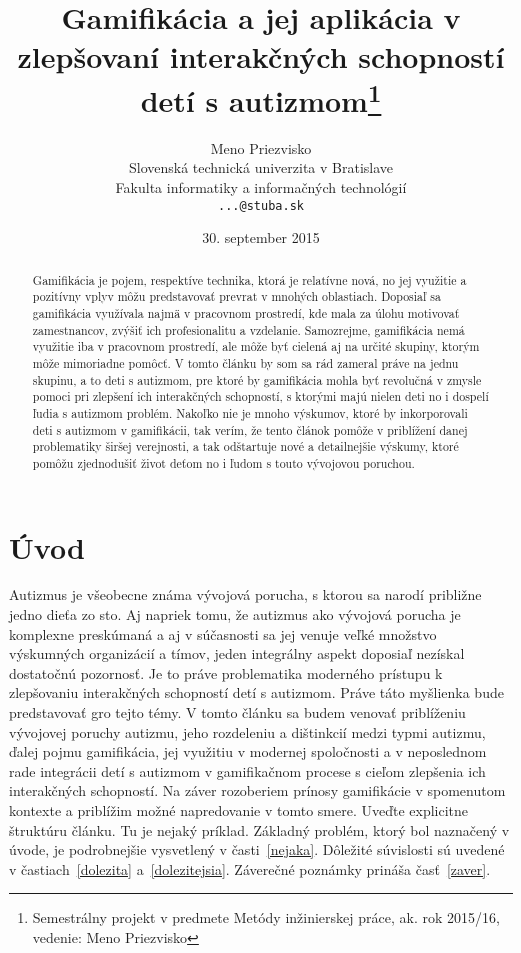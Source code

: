\documentclass[10pt,twoside,slovak,a4paper]{coursepaper}
\title{Gamifikácia a jej aplikácia v zlepšovaní interakčných schopností detí s autizmom\thanks{Semestrálny projekt v predmete Metódy inžinierskej práce, ak. rok 2015/16, vedenie: Meno Priezvisko}} %
\author{Meno Priezvisko\\[2pt]
	{\small Slovenská technická univerzita v Bratislave}\\
	{\small Fakulta informatiky a informačných technológií}\\
	{\small \texttt{...@stuba.sk}}
	}
\date{\small 30. september 2015} %
\begin{document}
\maketitle

\begin{abstract}
	Gamifikácia je pojem, respektíve technika, ktorá je relatívne nová, no jej využitie a pozitívny vplyv môžu predstavovať prevrat v mnohých oblastiach. Doposiaľ sa gamifikácia využívala najmä v pracovnom prostredí, kde mala za úlohu motivovať zamestnancov, zvýšiť ich profesionalitu a vzdelanie. Samozrejme, gamifikácia nemá využitie iba v pracovnom prostredí, ale môže byť cielená aj na určité skupiny, ktorým môže mimoriadne pomôcť. 
V tomto článku by som sa rád zameral práve na jednu skupinu, a to deti s autizmom, pre ktoré by gamifikácia mohla byť revolučná v zmysle pomoci pri zlepšení ich interakčných schopností, s ktorými majú nielen deti no i dospelí ľudia s autizmom problém. Nakoľko nie je mnoho výskumov, ktoré by inkorporovali deti s autizmom v gamifikácii, tak verím, že tento článok pomôže v priblížení danej problematiky širšej verejnosti, a tak odštartuje nové a detailnejšie výskumy, ktoré pomôžu zjednodušiť život deťom no i ľudom s touto vývojovou poruchou. 

\end{abstract}



\section{Úvod}
	Autizmus je všeobecne známa vývojová porucha, s ktorou sa narodí približne jedno dieťa zo sto. Aj napriek tomu, že autizmus ako vývojová porucha je komplexne preskúmaná a aj v súčasnosti sa jej venuje veľké množstvo výskumných organizácií a tímov, jeden integrálny aspekt doposiaľ nezískal dostatočnú pozornosť. Je to práve problematika moderného prístupu k zlepšovaniu interakčných schopností detí s autizmom. Práve táto myšlienka bude predstavovať gro tejto témy. V tomto článku sa budem venovať priblíženiu vývojovej poruchy autizmu, jeho rozdeleniu a dištinkcií medzi typmi autizmu, ďalej pojmu gamifikácia, jej využitiu v modernej spoločnosti a v neposlednom rade integrácii detí s autizmom v gamifikačnom procese s cieľom zlepšenia ich interakčných schopností. Na záver rozoberiem prínosy gamifikácie v spomenutom kontexte a priblížim možné napredovanie v tomto smere.   
Uveďte explicitne štruktúru článku. Tu je nejaký príklad.
Základný problém, ktorý bol naznačený v úvode, je podrobnejšie vysvetlený v časti~\ref{nejaka}.
Dôležité súvislosti sú uvedené v častiach~\ref{dolezita} a~\ref{dolezitejsia}.
Záverečné poznámky prináša časť~\ref{zaver}.
\end{document}
